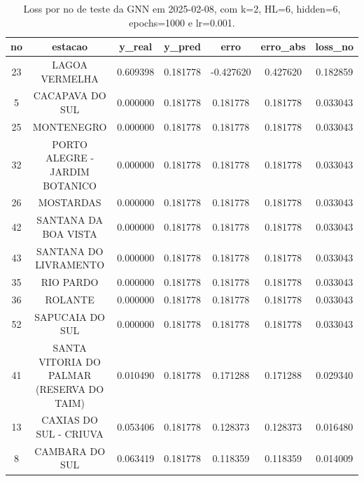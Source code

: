 \begin{table}[h]
\centering
\caption{Loss por no de teste da GNN em 2025-02-08, com k=2, HL=6, hidden=6, epochs=1000 e lr=0.001.}
\label{tab:gnn_loss_k2_hl6_h6_e1000_d20250208}
\begin{tabular}{ccccccc}
\toprule
no & estacao & y\_real & y\_pred & erro & erro\_abs & loss\_no \\
\midrule
23 & LAGOA VERMELHA & 0.609398 & 0.181778 & -0.427620 & 0.427620 & 0.182859 \\
5 & CACAPAVA DO SUL & 0.000000 & 0.181778 & 0.181778 & 0.181778 & 0.033043 \\
25 & MONTENEGRO & 0.000000 & 0.181778 & 0.181778 & 0.181778 & 0.033043 \\
32 & PORTO ALEGRE - JARDIM BOTANICO & 0.000000 & 0.181778 & 0.181778 & 0.181778 & 0.033043 \\
26 & MOSTARDAS & 0.000000 & 0.181778 & 0.181778 & 0.181778 & 0.033043 \\
42 & SANTANA DA BOA VISTA & 0.000000 & 0.181778 & 0.181778 & 0.181778 & 0.033043 \\
43 & SANTANA DO LIVRAMENTO & 0.000000 & 0.181778 & 0.181778 & 0.181778 & 0.033043 \\
35 & RIO PARDO & 0.000000 & 0.181778 & 0.181778 & 0.181778 & 0.033043 \\
36 & ROLANTE & 0.000000 & 0.181778 & 0.181778 & 0.181778 & 0.033043 \\
52 & SAPUCAIA DO SUL & 0.000000 & 0.181778 & 0.181778 & 0.181778 & 0.033043 \\
41 & SANTA VITORIA DO PALMAR (RESERVA DO TAIM) & 0.010490 & 0.181778 & 0.171288 & 0.171288 & 0.029340 \\
13 & CAXIAS DO SUL - CRIUVA & 0.053406 & 0.181778 & 0.128373 & 0.128373 & 0.016480 \\
8 & CAMBARA DO SUL & 0.063419 & 0.181778 & 0.118359 & 0.118359 & 0.014009 \\
\bottomrule
\end{tabular}
\end{table}
